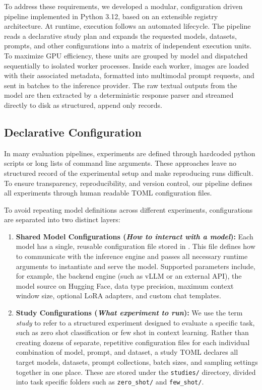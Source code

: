 To address these requirements, we developed a modular, configuration driven pipeline implemented in Python 3.12, based on an extensible registry architecture. At runtime, execution follows an automated lifecycle. The pipeline reads a declarative study plan and expands the requested models, datasets, prompts, and other configurations into a matrix of independent execution units. To maximize GPU efficiency, these units are grouped by model and dispatched sequentially to isolated worker processes. Inside each worker, images are loaded with their associated metadata, formatted into multimodal prompt requests, and sent in batches to the inference provider. The raw textual outputs from the model are then extracted by a deterministic response parser and streamed directly to disk as structured, append only records.

\subsection{Declarative Configuration}
\label{subsec:declarative_configuration}

In many evaluation pipelines, experiments are defined through hardcoded python scripts or long lists of command line arguments. These approaches leave no structured record of the experimental setup and make reproducing runs difficult. To ensure transparency, reproducibility, and version control, our pipeline defines all experiments through human readable TOML configuration files.

To avoid repeating model definitions across different experiments, configurations are separated into two distinct layers:
\begin{enumerate}
    \item \textbf{Shared Model Configurations (\emph{How to interact with a model}):} Each model has a single, reusable configuration file stored in \texttt{}. This file defines how to communicate with the inference engine and passes all necessary runtime arguments to instantiate and serve the model. Supported parameters include, for example, the backend engine (such as vLLM or an external API), the model source on Hugging Face, data type precision, maximum context window size, optional LoRA adapters, and custom chat templates.
    \item \textbf{Study Configurations (\emph{What experiment to run}):} We use the term \emph{study} to refer to a structured experiment designed to evaluate a specific task, such as zero shot classification or few shot in context learning. Rather than creating dozens of separate, repetitive configuration files for each individual combination of model, prompt, and dataset, a study TOML declares all target models, datasets, prompt collections, batch sizes, and sampling settings together in one place. These are stored under the \texttt{studies/} directory, divided into task specific folders such as \texttt{zero\_shot/} and \texttt{few\_shot/}.
\end{enumerate}


